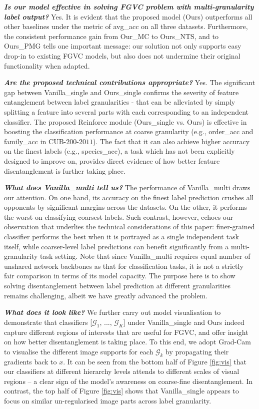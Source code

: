 \documentclass[final]{cvpr}
\newcommand{\keypoint}[1]{\vspace{0.05cm}\noindent\textbf{#1}\quad}
\begin{document}
\keypoint{\emph{Is our model effective in solving FGVC problem with multi-granularity label output?}} Yes. It is evident that the proposed model (Ours) outperforms all other baselines under the metric of avg\_acc on all three datasets. Furthermore, the consistent performance gain from Our\_MC to Ours\_NTS, and to Ours\_PMG tells one important message: our solution not only supports easy drop-in to existing FGVC models, but also does not undermine their original functionality when adapted.

\keypoint{\emph{Are the proposed technical contributions appropriate?}} Yes. The significant gap between Vanilla\_single and Ours\_single confirms the severity of feature entanglement between label granularities - that can be alleviated by simply splitting a feature into several parts with each corresponding to an independent classifier. The proposed Reinforce module (Ours\_single vs. Ours) is effective in boosting the 
classification performance at coarse granularity (e.g., order\_acc and family\_acc in CUB-$200$-$2011$). The fact that it can also achieve higher accuracy on the finest labels (e.g., species\_acc), a task which has not been explicitly designed to improve on, provides direct evidence of how better feature disentanglement is further taking place.

\keypoint{\emph{What does Vanilla\_multi tell us?}} The performance of Vanilla\_multi draws our attention. On one hand, its accuracy on the finest label prediction crushes all opponents by significant margins across the datasets. On the other, it performs the worst on classifying coarsest labels. Such contrast, however, echoes our observation that underlies the technical considerations of this paper: finer-grained classifier performs the best when it is portrayed as a single independent task itself, while coarser-level label predictions can benefit significantly from a multi-granularity task setting. Note that since Vanilla\_multi requires equal number of unshared network backbones as that for classification tasks, it is not a strictly fair comparison in terms of its model capacity. The purpose here is to show solving disentanglement between label prediction at different granularities remains challenging, albeit we have greatly advanced the problem.

\keypoint{\emph{What does it look like?}} {We further carry out model visualisation to demonstrate that classifiers [$\mathcal{G}_1$, ..., $\mathcal{G}_K$] under Vanilla\_single and Ours indeed capture different regions of interests that are useful for FGVC, and offer insight on how better disentanglement is taking place. To this end, we adopt Grad-Cam \cite{selvaraju2017grad} to visualise the different image supports for each $\mathcal{G}_k$ by propagating their gradients back to $x$. It can be seen from the bottom half of Figure \ref{fig:vis} that our classifiers at different hierarchy levels attends to different scales of visual regions -- a clear sign of the model's awareness on coarse-fine disentanglement. In contrast, the top half of Figure \ref{fig:vis} shows that Vanilla\_single appears to focus on similar un-regularised image parts across label granularity.} 
\end{document}
